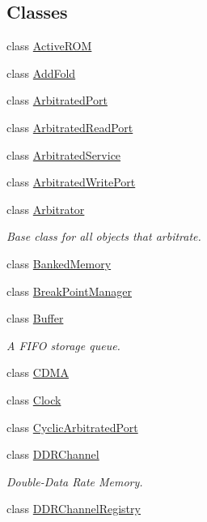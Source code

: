 \subsection*{Classes}
\begin{DoxyCompactItemize}
\item 
class \hyperlink{class_simulator_1_1_active_r_o_m}{Active\+R\+O\+M}
\item 
class \hyperlink{class_simulator_1_1_add_fold}{Add\+Fold}
\item 
class \hyperlink{class_simulator_1_1_arbitrated_port}{Arbitrated\+Port}
\item 
class \hyperlink{class_simulator_1_1_arbitrated_read_port}{Arbitrated\+Read\+Port}
\item 
class \hyperlink{class_simulator_1_1_arbitrated_service}{Arbitrated\+Service}
\item 
class \hyperlink{singleton_simulator_1_1_arbitrated_write_port}{Arbitrated\+Write\+Port}
\item 
class \hyperlink{class_simulator_1_1_arbitrator}{Arbitrator}
\begin{DoxyCompactList}\small\item\em Base class for all objects that arbitrate. \end{DoxyCompactList}\item 
class \hyperlink{class_simulator_1_1_banked_memory}{Banked\+Memory}
\item 
class \hyperlink{class_simulator_1_1_break_point_manager}{Break\+Point\+Manager}
\item 
class \hyperlink{class_simulator_1_1_buffer}{Buffer}
\begin{DoxyCompactList}\small\item\em A F\+I\+F\+O storage queue. \end{DoxyCompactList}\item 
class \hyperlink{class_simulator_1_1_c_d_m_a}{C\+D\+M\+A}
\item 
class \hyperlink{class_simulator_1_1_clock}{Clock}
\item 
class \hyperlink{class_simulator_1_1_cyclic_arbitrated_port}{Cyclic\+Arbitrated\+Port}
\item 
class \hyperlink{class_simulator_1_1_d_d_r_channel}{D\+D\+R\+Channel}
\begin{DoxyCompactList}\small\item\em Double-\/\+Data Rate Memory. \end{DoxyCompactList}\item 
class \hyperlink{class_simulator_1_1_d_d_r_channel_registry}{D\+D\+R\+Channel\+Registry}

\end{DoxyCompactItemize}
